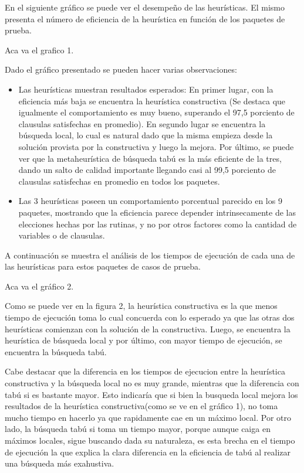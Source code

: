 \documentclass[a4paper,10pt]{article}
\begin{document}
En el siguiente gr\'afico se puede ver el desempe\~{n}o de las heur\'isticas. El mismo presenta el n\'umero de eficiencia de la heur\'istica en funci\'on de los paquetes de prueba.


Aca va el grafico 1.


Dado el gr\'afico presentado se pueden hacer varias observaciones:
\begin{itemize}
\item Las heur\'isticas muestran resultados esperados: En primer lugar, con la eficiencia m\'as baja se encuentra la heur\'istica constructiva (Se destaca que igualmente el comportamiento es muy bueno, superando el 97,5 porciento de clausulas satisfechas en promedio). En segundo lugar se encuentra la b\'usqueda local, lo cual es natural dado que la misma empieza desde la soluci\'on provista por la constructiva y luego la mejora. Por \'ultimo, se puede ver que la metaheur\'istica de b\'usqueda tab\'u es la m\'as eficiente de la tres, dando un salto de calidad importante llegando casi al 99,5 porciento de clausulas satisfechas en promedio en todos los paquetes.
\item Las 3 heur\'isticas poseen un comportamiento porcentual parecido en los 9 paquetes, mostrando que la eficiencia parece depender intrinsecamente de las elecciones hechas por las rutinas, y no por otros factores como la cantidad de variables o de clausulas.
\end{itemize}


A continuaci\'on se muestra el an\'alisis de los tiempos de ejecuci\'on de cada una de las heur\'isticas para estos paquetes de casos de prueba.


Aca va el gr\'afico 2.



Como se puede ver en la figura 2, la heur\'istica constructiva es la que menos tiempo de ejecuci\'on toma lo cual concuerda con lo esperado ya que las otras dos heur\'isticas comienzan con la soluci\'on de la constructiva. Luego, se encuentra la heur\'istica de b\'usqueda local y por \'ultimo, con mayor tiempo de ejecuci\'on, se encuentra la b\'usqueda tab\'u.

Cabe destacar que la diferencia en los tiempos de ejecucion entre la heur\'istica constructiva y la b\'usqueda local no es muy grande, mientras que la diferencia con tab\'u si es bastante mayor. Esto indicar\'ia que si bien la busqueda local mejora los resultados de la heur\'istica constructiva(como se ve en el gr\'afico 1), no toma mucho tiempo en hacerlo ya que rapidamente cae en un m\'aximo local. Por otro lado, la b\'usqueda tab\'u si toma un tiempo mayor, porque aunque caiga en m\'aximos locales, sigue buscando dada su naturaleza, es esta brecha en el tiempo de ejecuci\'on la que explica la clara diferencia en la eficiencia de tab\'u al realizar una b\'usqueda m\'as exahustiva.
\end{document}
